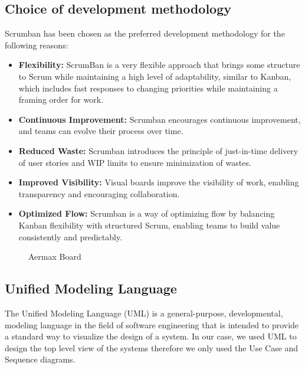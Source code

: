 \subsection{Choice of development methodology}
Scrumban has been chosen as the preferred development methodology for the following reasons:
\begin{itemize}
    \item \textbf{Flexibility:} ScrumBan is a very flexible approach that brings some structure to Scrum while maintaining a high level of adaptability, similar to Kanban, which includes fast responses to changing priorities while maintaining a framing order for work.
    \item \textbf{Continuous Improvement:} Scrumban encourages continuous improvement, and teams can evolve their process over time.
    \item \textbf{Reduced Waste:} Scrumban introduces the principle of just-in-time delivery of user stories and WIP limits to ensure minimization of wastes.
    \item \textbf{Improved Visibility:} Visual boards improve the visibility of work, enabling transparency and encouraging collaboration.
    \item \textbf{Optimized Flow:} Scrumban is a way of optimizing flow by balancing Kanban flexibility with structured Scrum, enabling teams to build value consistently and predictably.
\end{itemize}

\begin{figure}[H]
    \centering
    \caption{Aermax Board}
    \label{fig:armax-board}
\end{figure}
 
\subsection{Unified Modeling Language}
The Unified Modeling Language (UML) is a general-purpose, developmental, modeling language in the field of software engineering that is intended to provide a standard way to visualize the design of a system. In our case, we used UML to design the top level view of the systems therefore we only used the Use Case and Sequence diagrams.



